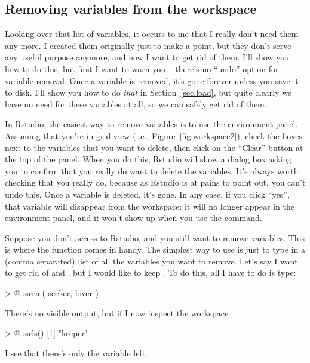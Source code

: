 \subsection{Removing variables from the workspace}

Looking over that list of variables, it occurs to me that I really don't need them any more. I created them originally just to make a point, but they don't serve any useful purpose anymore, and now I want to get rid of them.  I'll show you how to do this, but first I want to warn you -- there's no ``undo'' option for variable removal. Once a variable is removed, it's gone forever unless you save it to disk. I'll show you how to do {\it that} in Section~\ref{sec:load}, but quite clearly we have no need for these variables at all, so we can safely get rid of them.

In Rstudio, the easiest way to remove variables is to use the environment panel. Assuming that you're in grid view (i.e., Figure~\ref{fig:workspace2}), check the boxes next to the variables that you want to delete, then click on the ``Clear'' button at the top of the panel. When you do this, Rstudio will show a dialog box asking you to confirm that you really do want to delete the variables. It's always worth checking that you really do, because as Rstudio is at pains to point out, you can't undo this. Once a variable is deleted, it's gone. In any case, if you click ``yes'', that variable will disappear from the workspace: it will no longer appear in the environment panel, and it won't show up when you use the  command.

Suppose you don't access to Rstudio, and you still want to remove variables. This is where the  function  comes in handy. The simplest way to use  is just to type in a (comma separated) list of all the variables you want to remove. Let's say I want to get rid of  and , but I would like to keep . To do this, all I have to do is type:
\begin{rblock1}
> @usr{rm( seeker, lover )}
\end{rblock1}
There's no visible output, but if I now inspect the workspace
\begin{rblock1}
> @usr{ls()}
[1] "keeper"       
\end{rblock1}
I see that there's only the  variable left. 



